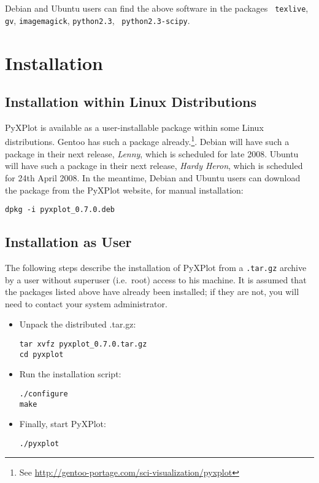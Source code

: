 Debian and Ubuntu users can find the above software in the packages {\tt
texlive}, {\tt gv}, {\tt imagemagick}, {\tt python2.3}, {\tt
python2.3-scipy}.

\section{Installation}

\subsection{Installation within Linux Distributions}

PyXPlot is available as a user-installable package within some Linux
distributions. Gentoo has such a package already.\footnote{See
\url{http://gentoo-portage.com/sci-visualization/pyxplot}}. Debian will have
such a package in their next release, {\it Lenny}, which is scheduled for late
2008.  Ubuntu will have such a package in their next release, {\it Hardy
Heron}, which is scheduled for 24th April 2008. In the meantime, Debian and
Ubuntu users can download the package from the PyXPlot website, for manual
installation:

\begin{verbatim}
dpkg -i pyxplot_0.7.0.deb
\end{verbatim}

\subsection{Installation as User}

The following steps describe the installation of PyXPlot from a {\tt .tar.gz}
archive by a user without superuser (i.e.\ root) access to his machine. It is
assumed that the packages listed above have already been installed; if they are
not, you will need to contact your system
administrator.

\begin{itemize}
\item Unpack the distributed .tar.gz:

\begin{verbatim}
tar xvfz pyxplot_0.7.0.tar.gz
cd pyxplot
\end{verbatim}

\item Run the installation script:

\begin{verbatim}
./configure
make
\end{verbatim}

\item Finally, start PyXPlot:

\begin{verbatim}
./pyxplot
\end{verbatim}

\end{itemize}

